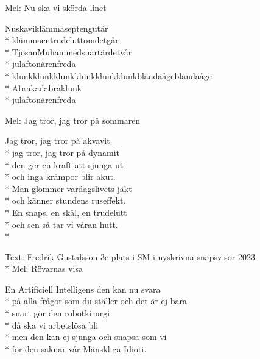 \begin{SongText}[Nuskaviklämmasepten]
    \begin{SongInfo}
        Mel: Nu ska vi skörda linet
    \end{SongInfo}
    \begin{SongVerse}
        Nuskaviklämmaseptengutår\\*%
        klämmaentrudeluttomdetgår\\*%
        TjosanMuhammedsnartärdetvår\\*%
        julaftonärenfreda\\*%
        klunkklunkklunkklunkklunkklunkblandaågeblandaåge\\*%
        Abrakadabraklunk\\*%
        julaftonärenfreda
    \end{SongVerse}
\end{SongText}
\begin{SongText}
    \begin{SongInfo}
        Mel: Jag tror, jag tror på sommaren
    \end{SongInfo}
    \begin{SongVerse}
        Jag tror, jag tror på akvavit\\*%
        jag tror, jag tror på dynamit\\*%
        den ger en kraft att sjunga ut\\*%
        och inga krämpor blir akut.\\*%
        Man glömmer vardagslivets jäkt\\*%
        och känner stundens ruseffekt.\\*%
        En snaps, en skål, en trudelutt\\*%
        och sen så tar vi våran hutt.\\*%
    \end{SongVerse}
\end{SongText}
\begin{SongText}
    \begin{SongInfo}
        Text: Fredrik Gustafsson 3e plats i SM i nyskrivna snapsvisor 2023\\*%
        Mel: Rövarnas visa
    \end{SongInfo}
    \begin{SongVerse}
        En Artificiell Intelligens den kan nu svara\\*%
        på alla frågor som du ställer och det är ej bara\\*%
        snart gör den robotkirurgi\\*%
        då ska vi arbetslösa bli\\*%
        men den kan ej sjunga och snapsa som vi\\*%
        för den saknar vår Mänskliga Idioti.
    \end{SongVerse}
\end{SongText}
\newpage